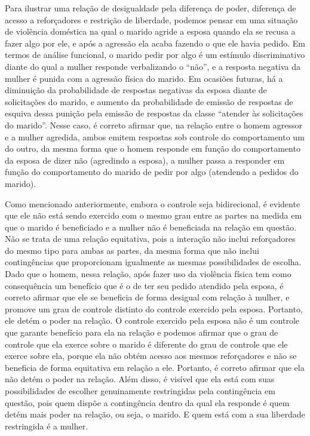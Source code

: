 Para ilustrar uma relação de desigualdade pela diferença de poder, diferença de acesso a reforçadores e restrição de liberdade, podemos pensar em uma situação de violência doméstica na qual o marido agride a esposa quando ela se recusa a fazer algo por ele, e após a agressão ela acaba fazendo o que ele havia pedido. Em termos de análise funcional, o marido pedir por algo é um estímulo discriminativo diante do qual a mulher responde verbalizando o ``não'', e a resposta negativa da mulher é punida com a agressão física do marido. Em ocasiões futuras, há a diminuição da probabilidade de respostas negativas da esposa diante de solicitações do marido, e aumento da probabilidade de emissão de respostas de esquiva dessa punição pela emissão de respostas da classe ``atender às solicitações do marido''. Nesse caso, é correto afirmar que, na relação entre o homem agressor e a mulher agredida, ambos emitem respostas sob controle do comportamento um do outro, da mesma forma que o homem responde em função do comportamento da esposa de dizer não (agredindo a esposa), a mulher passa a responder em função do comportamento do marido de pedir por algo (atendendo a pedidos do marido). 

Como mencionado anteriormente, embora o controle seja bidirecional, é evidente que ele não está sendo exercido com o mesmo grau entre as partes na medida em que o marido é beneficiado e a mulher não é beneficiada na relação em questão. Não se trata de uma relação equitativa, pois a interação não inclui reforçadores do mesmo tipo para ambas as partes, da mesma forma que não inclui contingências que proporcionam igualmente as mesmas possibilidades de escolha. Dado que o homem, nessa relação, após fazer uso da violência física tem como consequência um benefício que é o de ter seu pedido atendido pela esposa, é correto afirmar que ele se beneficia de forma desigual com relação à mulher, e promove um grau de controle distinto do controle exercido pela esposa. Portanto, ele detém o poder na relação. O controle exercido pela esposa não é um controle que garante benefício para ela na relação e podemos afirmar que o grau de controle que ela exerce sobre o marido é diferente do grau de controle que ele exerce sobre ela, porque ela não obtém acesso aos mesmos reforçadores e não se beneficia de forma equitativa em relação a ele. Portanto, é correto afirmar que ela não detém o poder na relação. Além disso, é visível que ela está com suas possibilidades de escolher genuinamente restringidas pela contingência em questão, pois quem dispõe a contingência dentro da qual ela responde é quem detém mais poder na relação, ou seja, o marido. E quem está com a sua liberdade restringida é a mulher.

